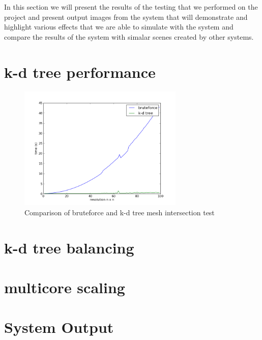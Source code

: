 In this section we will present the results of the testing that we performed on the project and
present output images from the system that will demonstrate and highlight various effects that
we are able to simulate with the system and compare the results of the system with simalar scenes
created by other systems.

\section{k-d tree performance}
\begin{figure}
\centering
\includegraphics[width=0.7\textwidth]{images/results/tri_intersection.png}
\caption{Comparison of bruteforce and k-d tree mesh intersection test}
\label{fig:bf_kd_comp}
\end{figure}

\section{k-d tree balancing}
\missingfigure{}
\section{multicore scaling}

\section{System Output}

